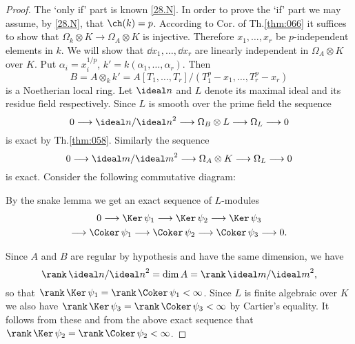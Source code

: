 \documentclass[../main]{subfiles}
\begin{document}
\begin{proof}
The `only if' part is known \ref{28.N}. In order to prove the `if' part we may assume, by \ref{28.N}, that $\ch(k) = p$. According to Cor. of Th.\ref{thm:066} it suffices to show that $\Omega_k \otimes K \longrightarrow \Omega_A \otimes K$ is injective. Therefore $x_1, \ldots, x_r$ be $p$-independent elements in $k$. We will show that $\dd x_1, \ldots, \dd x_r$ are linearly independent in $\Omega_A \otimes K$ over $K$. Put $\alpha_i = x_i^{1/p}$, $k' = k(\alpha_1, \ldots, \alpha_r)$. Then \[B = A \otimes_k k' = A[T_1, \ldots, T_r]/(T_1^p - x_1, \ldots, T_r^p - x_r)\] is a Noetherian local ring. Let $\ideal n$ and $L$ denote its maximal ideal and its residue field respectively. Since $L$ is smooth over the prime field the sequence \[0 \longrightarrow \ideal n/{\ideal n}^2 \longrightarrow \Omega_B \otimes L \longrightarrow \Omega_L \longrightarrow 0\] is exact by Th.\ref{thm:058}. Similarly the sequence \[0 \longrightarrow \ideal m/{\ideal m}^2 \longrightarrow \Omega_A \otimes K \longrightarrow \Omega_L \longrightarrow 0\] is exact. Consider the following commutative diagram:

\begin{center}
\end{center}
By the snake lemma we get an exact sequence of $L$-modules
\begin{gather*}
0 \longrightarrow \Ker \, \psi_1 \longrightarrow \Ker \, \psi_2 \longrightarrow \Ker \, \psi_3\\\longrightarrow \Coker \, \psi_1 \longrightarrow \Coker \, \psi_2 \longrightarrow \Coker \, \psi_3 \longrightarrow 0.
\end{gather*}

Since $A$ and $B$ are regular by hypothesis and have the same dimension, we have \[\rank \, \ideal n/{\ideal n}^2 = \dim A = \rank \, \ideal m/{\ideal m}^2,\] so that $\rank \, \Ker \, \psi_1 = \rank \, \Coker \, \psi_1 < \infty$. Since $L$ is finite algebraic over $K$ we also have $\rank \, \Ker \, \psi_3 = \rank \, \Coker \, \psi_3 < \infty$ by Cartier's equality. It follows from these and from the above exact sequence that $\rank \, \Ker \, \psi_2 = \rank \, \Coker \, \psi_2\linebreak< \infty$.


\end{proof}
\end{document}
